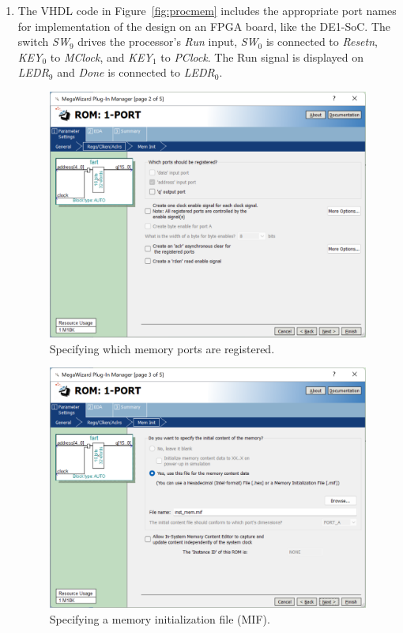 \documentclass[epsfig,10pt,fullpage]{article} \addtolength{\textwidth}{1.5in}
\begin{document}
\begin{enumerate}
\item The VHDL code in Figure~\ref{fig:procmem} includes the appropriate 
port names for implementation of the design on an FPGA board, like the DE1-SoC.
The switch {\it SW}$_{9}$ drives the processor's {\it Run} input, {\it SW}$_0$ is
connected to {\it Resetn}, {\it KEY}$_0$ to {\it MClock}, and {\it KEY}$_1$ to {\it PClock}.
The Run signal is displayed on {\it LEDR}$_{9}$ and {\it Done} is connected to {\it LEDR}$_{0}$.
\begin{figure}[H]
	\begin{center}
		\includegraphics[width=\textwidth]{figures/figure8.png}
	\end{center}
	\caption{Specifying which memory ports are registered.}
	\label{fig:fig8}
\end{figure}

\begin{figure}[H]
	\begin{center}
		\includegraphics[width=\textwidth]{figures/figure9.png}
	\end{center}
	\caption{Specifying a memory initialization file (MIF).}
	\label{fig:fig9}
\end{figure}


\end{enumerate}
\end{document}
